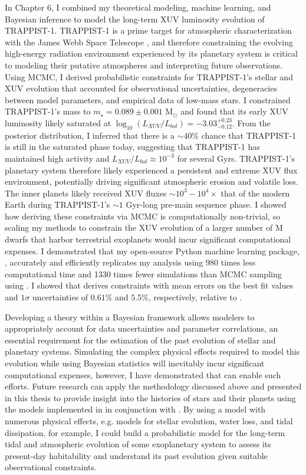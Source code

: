 In Chapter 6, I combined my theoretical modeling, machine learning, and Bayesian inference to model the long-term XUV luminosity evolution of TRAPPIST-1. TRAPPIST-1 is a prime target for atmospheric characterization with the James Webb Space Telescope \citep{Morley2017,Lincowski2018,Lustig2019}, and therefore constraining the evolving high-energy radiation environment experienced by its planetary system is critical to modeling their putative atmospheres and interpreting future observations. Using MCMC, I derived probabilistic constraints for TRAPPIST-1's stellar and XUV evolution that accounted for observational uncertainties, degeneracies between model parameters, and empirical data of low-mass stars. I constrained TRAPPIST-1's mass to $m_{\star} = 0.089 \pm{0.001}$ M$_{\odot}$ and found that its early XUV luminosity likely saturated at $\log_{10}(L_{XUV}/L_{bol}) = -3.03^{+0.23}_{-0.12}$. From the posterior distribution, I inferred that there is a ${\sim}40\%$ chance that TRAPPIST-1 is still in the saturated phase today, suggesting that TRAPPIST-1 has maintained high activity and $L_{XUV}/L_{bol} \approx 10^{-3}$ for several Gyrs. TRAPPIST-1's planetary system therefore likely experienced a persistent and extreme XUV flux environment, potentially driving significant atmospheric erosion and volatile loss. The inner planets likely received XUV fluxes ${\sim}10^3 - 10^4\times$ that of the modern Earth during TRAPPIST-1's ${\sim}1$ Gyr-long pre-main sequence phase. I showed how deriving these constraints via MCMC is computationally non-trivial, so scaling my methods to constrain the XUV evolution of a larger number of M dwarfs that harbor terrestrial exoplanets would incur significant computational expenses. I demonstrated that my open-source Python machine learning package, \approxposterior, accurately and efficiently replicates my analysis using 980 times less computational time and 1330 times fewer simulations than MCMC sampling using \emcee. I showed that \approxposterior derives constraints with mean errors on the best fit values and $1\sigma$ uncertainties of $0.61\%$ and $5.5\%$, respectively, relative to \emcee.

Developing a theory within a Bayesian framework allows modelers to appropriately account for data uncertainties and parameter correlations, an essential requirement for the estimation of the past evolution of stellar and planetary systems. Simulating the complex physical effects required to model this evolution while using Bayesian statistics will inevitably incur significant computational expenses, however, I have demonstrated that \approxposterior can enable such efforts. Future research can apply the methodology discussed above and presented in this thesis to provide insight into the histories of stars and their planets using the models implemented in \vplanet in conjunction with \approxposterior. By using a model with numerous physical effects, e.g. models for stellar evolution, water loss, and tidal dissipation, for example, I could build a probabilistic model for the long-term tidal and atmospheric evolution of some exoplanetary system to assess its present-day habitability and understand its past evolution given suitable observational constraints. 

